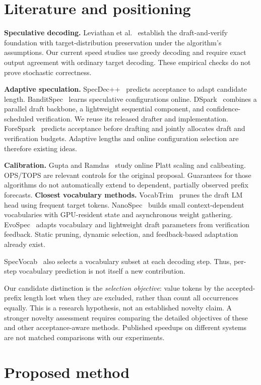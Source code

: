 \documentclass[10pt]{article}
\begin{document}
\section{Literature and positioning}
\textbf{Speculative decoding.} Leviathan et al.~\cite{leviathan} establish the draft-and-verify foundation with target-distribution preservation under the algorithm's assumptions. Our current speed studies use greedy decoding and require exact output agreement with ordinary target decoding. These empirical checks do not prove stochastic correctness.

\textbf{Adaptive speculation.} SpecDec++~\cite{specdec} predicts acceptance to adapt candidate length. BanditSpec~\cite{bandit} learns speculative configurations online. DSpark~\cite{dspark} combines a parallel draft backbone, a lightweight sequential component, and confidence-scheduled verification. We reuse its released drafter and implementation. ForeSpark~\cite{forespark} predicts acceptance before drafting and jointly allocates draft and verification budgets. Adaptive lengths and online configuration selection are therefore existing ideas.

\textbf{Calibration.} Gupta and Ramdas~\cite{ops} study online Platt scaling and calibeating. OPS/TOPS are relevant controls for the original proposal. Guarantees for those algorithms do not automatically extend to dependent, partially observed prefix forecasts.
\textbf{Closest vocabulary methods.} VocabTrim~\cite{vocabtrim} prunes the draft LM head using frequent target tokens. NanoSpec~\cite{nanospec} builds small context-dependent vocabularies with GPU-resident state and asynchronous weight gathering. EvoSpec~\cite{evospec} adapts vocabulary and lightweight draft parameters from verification feedback. Static pruning, dynamic selection, and feedback-based adaptation already exist.

SpecVocab~\cite{specvocab} also selects a vocabulary subset at each decoding step. Thus, per-step vocabulary prediction is not itself a new contribution.

Our candidate distinction is the \emph{selection objective}: value tokens by the accepted-prefix length lost when they are excluded, rather than count all occurrences equally. This is a research hypothesis, not an established novelty claim. A stronger novelty assessment requires comparing the detailed objectives of these and other acceptance-aware methods. Published speedups on different systems are not matched comparisons with our experiments.
\section{Proposed method}
\end{document}

